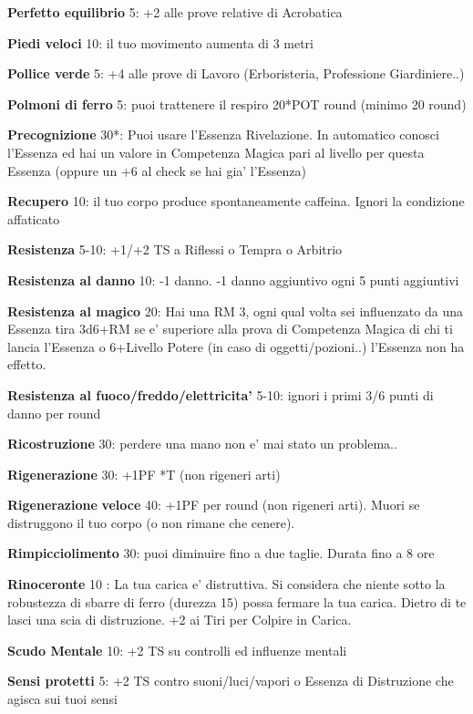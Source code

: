 \documentclass[a4paper,11pt,twoside,openany]{book}
\begin{document}
\textbf{Perfetto equilibrio} 5: +2 alle prove relative di Acrobatica

\textbf{Piedi veloci} 10: il tuo movimento aumenta di 3 metri

\textbf{Pollice verde} 5: +4 alle prove di Lavoro (Erboristeria, Professione Giardiniere..)

\textbf{Polmoni di ferro} 5: puoi trattenere il respiro 20*POT round (minimo 20 round)

\textbf{Precognizione} 30{*}: Puoi usare l'Essenza Rivelazione. In automatico conosci l'Essenza ed hai un valore in Competenza Magica pari al livello per questa Essenza (oppure un +6 al check se hai gia' l'Essenza)

\textbf{Recupero} 10: il tuo corpo produce spontaneamente caffeina.  Ignori la condizione affaticato

\textbf{Resistenza} 5-10: +1/+2 TS a Riflessi o Tempra o Arbitrio

\textbf{Resistenza al danno} 10: -1 danno. -1 danno aggiuntivo ogni 5 punti aggiuntivi

\textbf{Resistenza al magico} 20: Hai una RM 3, ogni qual volta sei influenzato da una Essenza tira 3d6+RM se e' superiore alla prova di Competenza Magica di chi ti lancia l'Essenza o 6+Livello Potere (in caso di oggetti/pozioni..) l'Essenza non ha effetto.

\textbf{Resistenza al fuoco/freddo/elettricita'} 5-10: ignori i primi 3/6 punti di danno per round

\textbf{Ricostruzione} 30: perdere una mano non e' mai stato un problema..

\textbf{Rigenerazione} 30: +1PF {*}T (non rigeneri arti)

\textbf{Rigenerazione} \textbf{veloce} 40: +1PF per round (non rigeneri arti). Muori se distruggono il tuo corpo (o non rimane che cenere).

\textbf{Rimpicciolimento} 30: puoi diminuire fino a due taglie. Durata fino a 8 ore

\textbf{Rinoceronte} 10 : La tua carica e' distruttiva. Si considera che niente sotto la robustezza di sbarre di ferro (durezza 15) possa fermare la tua carica. Dietro di te lasci una scia di distruzione. +2 ai Tiri per Colpire in Carica.

\textbf{Scudo Mentale} 10: +2 TS su controlli ed influenze mentali

\textbf{Sensi protetti} 5: +2 TS contro suoni/luci/vapori o Essenza di Distruzione che agisca sui tuoi sensi
\end{document}
